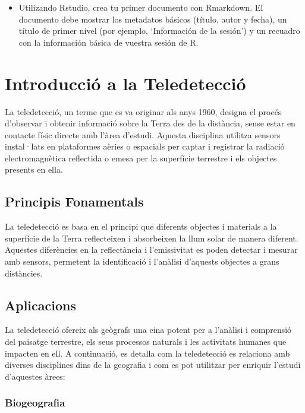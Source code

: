 \documentclass[
]{book}
\providecommand{\tightlist}{%
  \setlength{\itemsep}{0pt}\setlength{\parskip}{0pt}}
\begin{document}
\begin{itemize}
\tightlist
\item
  Utilizando Rstudio, crea tu primer documento con Rmarkdown. El documento debe mostrar los metadatos básicos (título, autor y fecha), un título de primer nivel (por ejemplo, `Información de la sesión') y un recuadro con la información básica de vuestra sesión de R.
\end{itemize}

\hypertarget{intro}{%
\chapter{Introducció a la Teledetecció}\label{intro}}

La teledetecció, un terme que es va originar als anys 1960, designa el procés d'observar i obtenir informació sobre la Terra des de la distància, sense estar en contacte físic directe amb l'àrea d'estudi. Aquesta disciplina utilitza sensors instal·lats en plataformes aèries o espacials per captar i registrar la radiació electromagnètica reflectida o emesa per la superfície terrestre i els objectes presents en ella.

\hypertarget{principis-fonamentals}{%
\section{Principis Fonamentals}\label{principis-fonamentals}}

La teledetecció es basa en el principi que diferents objectes i materials a la superfície de la Terra reflecteixen i absorbeixen la llum solar de manera diferent. Aquestes diferències en la reflectància i l'emissivitat es poden detectar i mesurar amb sensors, permetent la identificació i l'anàlisi d'aquests objectes a grans distàncies.

\hypertarget{aplicacions}{%
\section{Aplicacions}\label{aplicacions}}

La teledetecció ofereix als geògrafs una eina potent per a l'anàlisi i comprensió del paisatge terrestre, els seus processos naturals i les activitats humanes que impacten en ell. A continuació, es detalla com la teledetecció es relaciona amb diverses disciplines dins de la geografia i com es pot utilitzar per enriquir l'estudi d'aquestes àrees:

\hypertarget{biogeografia}{%
\subsection{Biogeografia}\label{biogeografia}}
\end{document}
